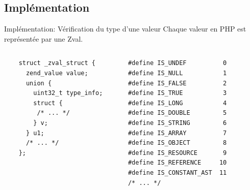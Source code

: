 \documentclass[10pt]{beamer}
\begin{document}
\subsection{Implémentation}
\begin{frame}[fragile]{Implémentation: Vérification du type d'une valeur}
    Chaque valeur en PHP est représentée par une \alert{Zval}.
      \begin{columns}[T,onlytextwidth]
    \begin{verbatim}
    struct _zval_struct {
      zend_value value;
      union {
        uint32_t type_info;
        struct {
         /* ... */
        } v;
      } u1;
      /* ... */
    };
    \end{verbatim}
    
    \begin{verbatim}
    #define IS_UNDEF          0
    #define IS_NULL           1
    #define IS_FALSE          2
    #define IS_TRUE           3
    #define IS_LONG           4
    #define IS_DOUBLE         5
    #define IS_STRING         6
    #define IS_ARRAY          7
    #define IS_OBJECT         8
    #define IS_RESOURCE       9
    #define IS_REFERENCE     10
    #define IS_CONSTANT_AST  11
    /* ... */
    \end{verbatim}
      \end{columns}
\end{frame}
\end{document}
